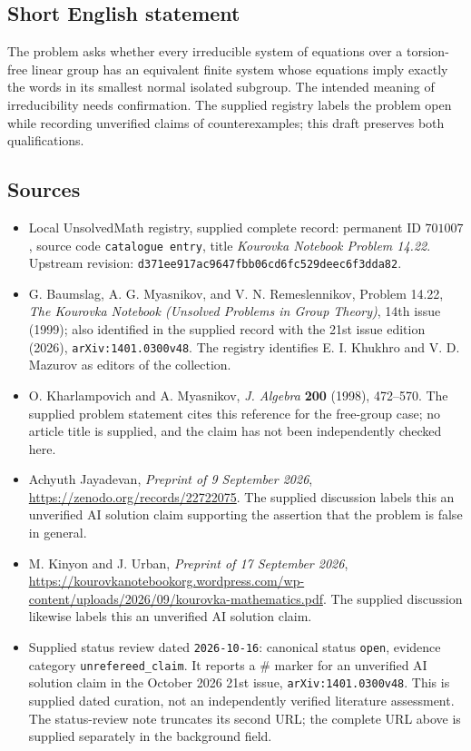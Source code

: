 \documentclass[11pt]{article}
\begin{document}
\subsection{Short English statement}
The problem asks whether every irreducible system of equations over a torsion-free linear group has an equivalent finite system whose equations imply exactly the words in its smallest normal isolated subgroup. The intended meaning of irreducibility needs confirmation. The supplied registry labels the problem open while recording unverified claims of counterexamples; this draft preserves both qualifications.
\subsection{Sources}
\begin{itemize}
\item Local UnsolvedMath registry, supplied complete record: permanent ID \(701007\), source code \texttt{catalogue entry}, title \emph{Kourovka Notebook Problem 14.22}. Upstream revision: \texttt{d371ee917ac9647fbb06cd6fc529deec6f3dda82}.
\item G. Baumslag, A. G. Myasnikov, and V. N. Remeslennikov, Problem 14.22, \emph{The Kourovka Notebook (Unsolved Problems in Group Theory)}, 14th issue (1999); also identified in the supplied record with the 21st issue edition (2026), \texttt{arXiv:1401.0300v48}. The registry identifies E. I. Khukhro and V. D. Mazurov as editors of the collection.
\item O. Kharlampovich and A. Myasnikov, \emph{J. Algebra} \textbf{200} (1998), 472--570. The supplied problem statement cites this reference for the free-group case; no article title is supplied, and the claim has not been independently checked here.
\item Achyuth Jayadevan, \emph{Preprint of 9 September 2026}, \url{https://zenodo.org/records/22722075}. The supplied discussion labels this an unverified AI solution claim supporting the assertion that the problem is false in general.
\item M. Kinyon and J. Urban, \emph{Preprint of 17 September 2026}, \url{https://kourovkanotebookorg.wordpress.com/wp-content/uploads/2026/09/kourovka-mathematics.pdf}. The supplied discussion likewise labels this an unverified AI solution claim.
\item Supplied status review dated \texttt{2026-10-16}: canonical status \texttt{open}, evidence category \texttt{unrefereed\_claim}. It reports a \(\#\) marker for an unverified AI solution claim in the October 2026 21st issue, \texttt{arXiv:1401.0300v48}. This is supplied dated curation, not an independently verified literature assessment. The status-review note truncates its second URL; the complete URL above is supplied separately in the background field.
\end{itemize}
\end{document}
